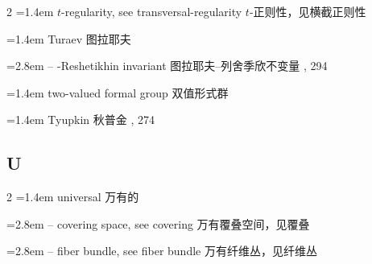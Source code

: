 \begin{multicols}{2}
\noindent\hangindent=1.4em $t$-regularity, see transversal-regularity \quad $t$-正则性，见横截正则性 \quad\par
\noindent\hangindent=1.4em Turaev \quad 图拉耶夫 \par
\noindent\hangindent=2.8em -- -Reshetikhin invariant \quad 图拉耶夫--列舍季欣不变量 , 294\par
\noindent\hangindent=1.4em two-valued formal group \quad 双值形式群 \par
\noindent\hangindent=1.4em Tyupkin \quad 秋普金 , 274\par
\end{multicols}

\subsection*{U}
\small
\begin{multicols}{2}
\noindent\hangindent=1.4em universal \quad 万有的 \quad\par
\noindent\hangindent=2.8em -- covering space, see covering \quad 万有覆叠空间，见覆叠 \quad\par
\noindent\hangindent=2.8em -- fiber bundle, see fiber bundle \quad 万有纤维丛，见纤维丛 \quad\par
\end{multicols}

